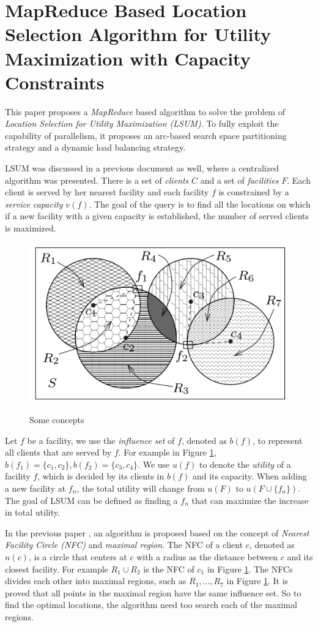 \documentclass[paper=a4, fontsize=18pt]{article} %
\numberwithin{equation}{section} %
\numberwithin{figure}{section} %
\numberwithin{table}{section} %
\begin{document}
\section{MapReduce Based Location Selection Algorithm for Utility Maximization with Capacity Constraints \cite{SQZCD15}}

This paper proposes a \emph{MapReduce} based algorithm to solve the problem of \emph{Location Selection for Utility Maximization (LSUM)}. To fully exploit the capability of parallelism, it proposes an arc-based search space partitioning strategy and a dynamic load balancing strategy.

LSUM was discussed in a previous document as well, where a centralized algorithm was presented. There is a set of \emph{clients} $C$ and a set of \emph{facilities} $F$. Each client is served by her nearest facility and each facility $f$ is constrained by a \emph{service capacity} $v(f)$. The goal of the query is to find all the locations on which if a new facility with a given capacity is established, the number of served clients is maximized.

\begin{figure}[h]
  \centering
  \includegraphics[width=.5\linewidth]{8_15_LSUM1.png}\\
  \caption{Some concepts}\label{fig:LSUM1}
\end{figure}

Let $f$ be a facility, we use the \emph{influence set} of $f$, denoted as $b(f)$, to represent all clients that are served by $f$. For example in Figure \ref{fig:LSUM1}, $b(f_1) = \{c_1, c_2\}, b(f_2) = \{c_3, c_4\}$. We use $u(f)$ to denote the \emph{utility} of a facility $f$, which is decided by its clients in $b(f)$ and its capacity. When adding a new facility at $f_n$, the total utility will change from $u(F)$ to $u(F \cup \{f_n\})$. The goal of LSUM can be defined as finding a $f_n$ that can maximize the increase in total utility.

In the previous paper \cite{SHCZD12}, an algorithm is proposed based on the concept of \emph{Nearest Facility Circle (NFC)} and \emph{maximal region}. The NFC of a client $c$, denoted as $n(c)$, is a circle that centers at $c$ with a radius as the distance between $c$ and its closest facility. For example $R_1 \cup R_2$ is the NFC of $c_1$ in Figure \ref{fig:LSUM1}. The NFCs divides each other into maximal regions, such as $R_1, ..., R_7$ in Figure \ref{fig:LSUM1}. It is proved that all points in the maximal region have the same influence set. So to find the optimal locations, the algorithm need too search each of the maximal regions.
\end{document}
